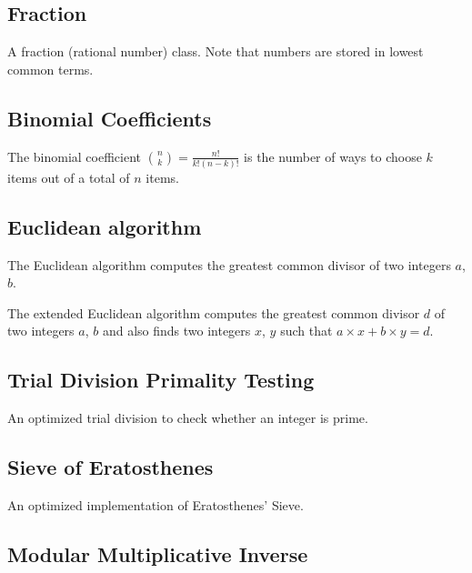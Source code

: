 \documentclass[10pt,a4paper,titlepage]{article}
\begin{document}
		\subsection{Fraction}
			A fraction (rational number) class. Note that numbers are stored in lowest common terms.
			

		\subsection{Binomial Coefficients}
			The binomial coefficient $\binom{n}{k} = \frac{n!}{k!(n-k)!}$ is the number of ways to choose $k$ items out of a total of $n$ items.
		
			
		
			
		
			

		\subsection{Euclidean algorithm}
			The Euclidean algorithm computes the greatest common divisor of two integers $a$, $b$.
			

			The extended Euclidean algorithm computes the greatest common divisor $d$ of two integers $a$, $b$ and also finds two integers $x$, $y$ such that $a\times x + b\times y = d$.
			

		\subsection{Trial Division Primality Testing}
			An optimized trial division to check whether an integer is prime.
			

		\subsection{Sieve of Eratosthenes}
			An optimized implementation of Eratosthenes' Sieve.
			

		\subsection{Modular Multiplicative Inverse}
			
\end{document}
